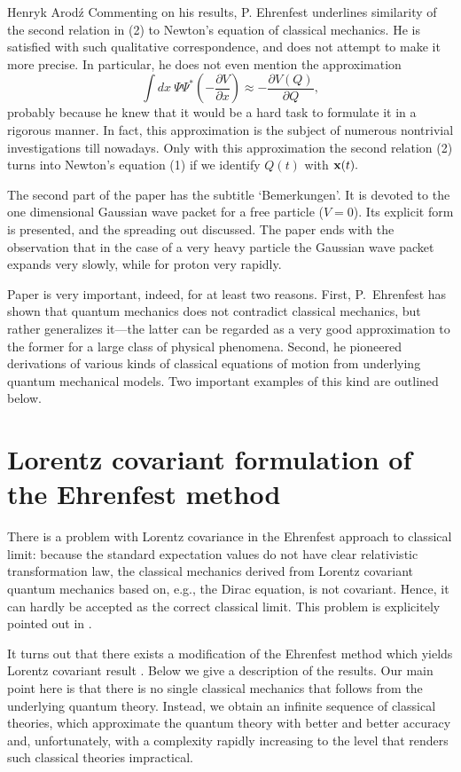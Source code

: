 \begin{artengenv}{Henryk Arod\'z}
Commenting on his results, P. Ehrenfest underlines similarity of the second relation in (2) to Newton's equation of classical mechanics. He is satisfied with such qualitative correspondence, and does not attempt to make it more precise. In particular, he does not even mention the approximation
\[ \int \! dx \:\Psi \Psi^* (- \frac{\partial V}{\partial x}) \approx - \frac{\partial V(Q)}{\partial Q}, \]
probably because he knew that it would be a hard task to formulate it in a rigorous manner. In fact, this approximation is the subject of numerous nontrivial investigations till nowadays. Only with this approximation the second relation (2) turns into Newton's equation (1) 
if we identify $ Q(t)$ with ${\bf x}(t).$ 


The second part of the paper has the subtitle `Bemerkungen'. It is devoted to the one dimensional Gaussian wave packet for a free particle ($V=0$). Its explicit form is presented, and the spreading out discussed. The paper ends with the observation that in the case of a very heavy particle the Gaussian wave packet expands very slowly, while for proton very rapidly. 

Paper \parencite{ehr} is very important, indeed, for at least two reasons. First, P.~Ehrenfest has shown that quantum mechanics does not contradict classical mechanics, but rather generalizes it---the latter can be regarded as a very good approximation to the former for a large class of physical phenomena. 
Second, he pioneered derivations of various kinds of classical equations of motion from underlying quantum mechanical models. Two important examples of this kind are outlined below. 





\section{Lorentz covariant formulation of the Ehrenfest method}

There is a problem with Lorentz covariance in the Ehrenfest approach to classical limit: because the standard expectation values do not have clear relativistic transformation law, the classical mechanics derived from Lorentz covariant quantum mechanics based on, e.g., the Dirac equation, is not covariant. Hence, it can hardly be accepted as the correct classical limit. This problem is explicitely pointed out in \parencite{HilWou}. 

It turns out that there exists a modification of the Ehrenfest method which yields Lorentz covariant result \parencite{aro1}. Below we give a description of the results. Our main point here is that there is no single classical mechanics that follows from the underlying quantum theory. Instead, we obtain an infinite sequence of classical theories, which approximate the quantum theory with better and better accuracy and, unfortunately, with a complexity rapidly increasing to the level that renders such classical theories impractical. 




\end{artengenv}
